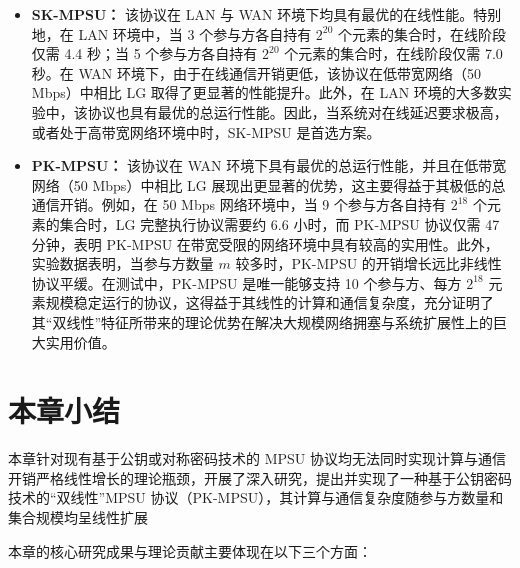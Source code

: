 \begin{itemize}
\item \textbf{SK-MPSU：} 该协议在 LAN 与 WAN 环境下均具有最优的在线性能。特别地，在 LAN 环境中，当 3 个参与方各自持有 $2^{20}$ 个元素的集合时，在线阶段仅需 4.4 秒；当 5 个参与方各自持有 $2^{20}$ 个元素的集合时，在线阶段仅需 7.0 秒。在 WAN 环境下，由于在线通信开销更低，该协议在低带宽网络（50 Mbps）中相比 LG 取得了更显著的性能提升。此外，在 LAN 环境的大多数实验中，该协议也具有最优的总运行性能。因此，当系统对在线延迟要求极高，或者处于高带宽网络环境中时，SK-MPSU 是首选方案。

\item \textbf{PK-MPSU：} 该协议在 WAN 环境下具有最优的总运行性能，并且在低带宽网络（50 Mbps）中相比 LG 展现出更显著的优势，这主要得益于其极低的总通信开销。例如，在 50 Mbps 网络环境中，当 9 个参与方各自持有 $2^{18}$ 个元素的集合时，LG 完整执行协议需要约 6.6 小时，而 PK-MPSU 协议仅需 47 分钟，表明 PK-MPSU 在带宽受限的网络环境中具有较高的实用性。此外，实验数据表明，当参与方数量 $m$ 较多时，PK-MPSU 的开销增长远比非线性协议平缓。在测试中，PK-MPSU 是唯一能够支持 10 个参与方、每方 $2^{18}$ 元素规模稳定运行的协议，这得益于其线性的计算和通信复杂度，充分证明了其“双线性”特征所带来的理论优势在解决大规模网络拥塞与系统扩展性上的巨大实用价值。
\end{itemize}

\section{本章小结}

本章针对现有基于公钥或对称密码技术的 MPSU 协议均无法同时实现计算与通信开销严格线性增长的理论瓶颈，开展了深入研究，提出并实现了一种基于公钥密码技术的“双线性”MPSU 协议（PK-MPSU），其计算与通信复杂度随参与方数量和集合规模均呈线性扩展

本章的核心研究成果与理论贡献主要体现在以下三个方面：

